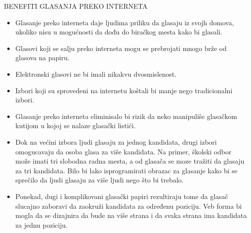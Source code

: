 \documentclass[a4paper]{article}
\begin{document}
\noindent BENEFITI GLASANJA PREKO INTERNETA
\begin{itemize}
\item Glasanje preko interneta daje ljudima priliku da glasaju iz svojh domova, ukoliko nisu u mogućnosti da dođu do biračkog mesta kako bi glasali.
\item Glasovi koji se salju preko interneta mogu se prebrojati mnogo brže od glasova na papiru.
\item Elektronski glasovi ne bi imali nikakvu dvosmislenost.
\item Izbori koji su sprovedeni na internetu koštali bi manje nego tradicionalni izbori.
\item Glasanje preko interneta eliminisalo bi rizik da neko manipuliše glasačkom kutijom u kojoj se nalaze glasački listići.
\item Dok na većini izbora ljudi glasaju za jednog kandidata, drugi izbori omogucavaju da osoba glasa za više kandidata. Na primer, školski odbor može imati tri slobodna radna mesta, a od glasača se moze tražiti da glasaju za tri kandidata. Bilo bi lako isprogramirati obrazac za glasanje kako bi se sprečilo da ljudi glasaju za više ljudi nego što bi trebalo.
\item Ponekad, dugi i komplikovani glasački papiri rezultiraju tome da glasač slucajno zaboravi da zaokruži kandidata za određenu poziciju. Veb forma bi mogla da se dizajnira da bude na više strana i da svaka strana ima kandidata za jednu poziciju.
\end{itemize}
\end{document}
